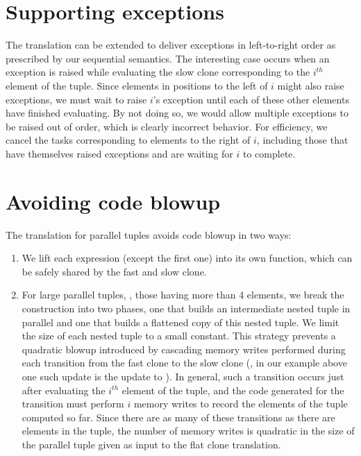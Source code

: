 \documentclass[11pt]{article}
\begin{document}
\section{Supporting exceptions}
\label{sec:exceptions}
The translation can be extended to deliver exceptions in left-to-right order
as prescribed by our sequential semantics. The interesting case
occurs when an exception is raised while evaluating the slow clone 
corresponding to the $i^{th}$ element of the tuple. Since elements in
positions to the left of $i$ might also raise exceptions, we must wait
to raise $i$'s exception until each of these other elements have finished
evaluating. By not doing so, we would allow multiple exceptions to be
raised out of order, which is clearly incorrect behavior. For efficiency, 
we cancel the tasks corresponding to elements to the right of $i$, including
those that have themselves raised exceptions and are waiting for
$i$ to complete.

\section{Avoiding code blowup}
\label{sec:avoiding-code-blowup}
The translation for parallel tuples avoids code blowup in two ways:
\begin{enumerate}
\item We lift each expression (except the first one) into its own function,
which can be safely shared by the fast and slow clone.
\item For large parallel tuples, \eg{}, those having more than 4 elements, we 
break the construction into two phases, one that builds an
intermediate nested tuple in parallel and one that builds a flattened
copy of this nested tuple. We limit the size of each nested tuple 
to a small constant. This strategy prevents a quadratic blowup introduced
by cascading memory writes performed during each transition 
from the fast clone to the slow clone (\eg{}, in our  example above
one such update is the update to ). In general, such a
transition occurs just after evaluating 
the $i^{th}$ element of the tuple, and the code generated for the transition
must perform $i$ memory writes to record the elements of the tuple computed so 
far. Since there are as many of these transitions as there are elements in the
tuple, the number of memory writes is quadratic in the size of the parallel 
tuple given as input to the flat clone translation.
\end{enumerate}
\end{document}
